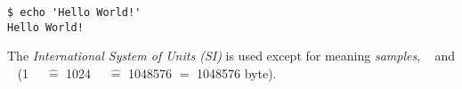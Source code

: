 \begin{lstlisting}[style=Shell]
$ echo 'Hello World!'
Hello World!
\end{lstlisting}

The \emph{International System of Units (SI)} is used except for \si{\samples}
meaning \emph{samples}, \si{\mebi\byte} and \si{\kibi\byte} (\SI{1}{\mebi\byte}
$\hat{=}$ \SI{1024}{\kibi\byte} $\hat{=}$ \SI{1048576}{\byte} $=$ 1048576 byte).


